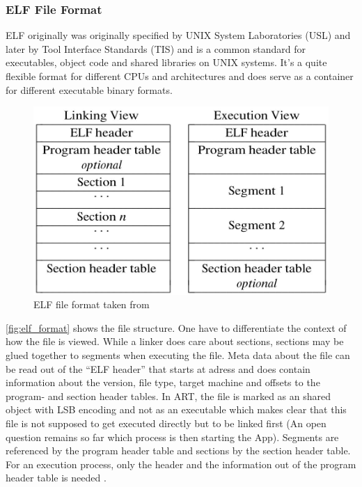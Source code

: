 \subsubsection{ELF File Format}\label{section:elf_file_format}
ELF originally was originally specified by UNIX System Laboratories
(USL) and later by Tool Interface Standards (TIS) and is a common
standard for executables, object code and shared libraries on UNIX
systems. It's a quite flexible format for different CPUs and
architectures and does serve as a container for different
executable binary formats.

\begin{figure}[htb]
  \centering
  \includegraphics[scale=0.4]{figures/elf_format}
  \caption[ELF file format]{ELF file format taken from \parencite{portable_formats_spec}}
  \label{fig:elf_format}
\end{figure}

\autoref{fig:elf_format} shows the file structure.
One have to differentiate the context of how the file is viewed.
While a linker does care about sections, sections may be
glued together to segments when executing the file.
Meta data about the file can be read out of the ``ELF header''
that starts at adress  and does contain
information about the version, file type, target machine and
offsets to the program- and section header tables.
In ART, the file is marked as an shared object with LSB encoding
and not as an executable which makes clear that this file is not
supposed to get executed directly but to be linked first
(An open question remains so far which process is then starting
the App).
Segments are referenced by the program header table and sections
by the section header table. For an execution process, only the header
and the information out of the program header table is needed
\parencite{life_of_binaries}.


